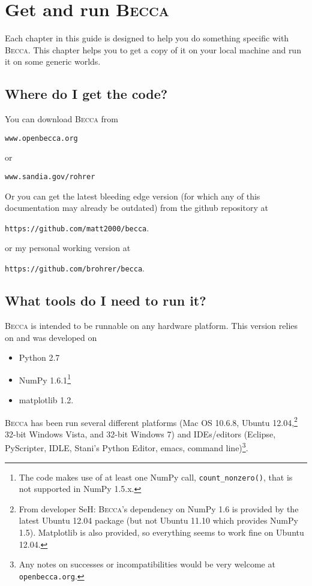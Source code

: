 \chapter{Get and run \textsc{Becca}}

Each chapter in this guide is designed to help you do something specific with \textsc{Becca}. This chapter helps you to get a copy of it on your local machine and run it on some generic worlds.

\section{Where do I get the code?}

You can download \textsc{Becca} from 

\texttt{www.openbecca.org} 

or 

\texttt{www.sandia.gov/rohrer} 

Or you can get the latest bleeding edge version (for which any of this documentation may already be outdated) from the github repository at

\texttt{https://github.com/matt2000/becca}.

or my personal working version at

\texttt{https://github.com/brohrer/becca}.

\section{What tools do I need to run it?}

\textsc{Becca} is intended to be runnable on any hardware platform. This version relies on and was developed on 
\begin{itemize}
\item{Python 2.7}
\item{NumPy 1.6.1\footnote{The code makes use of at least one NumPy call, \texttt{count\_nonzero()}, that is not supported in NumPy 1.5.x.} }
\item{matplotlib 1.2}.
\end{itemize}
\textsc{Becca} has been run several different platforms (Mac OS 10.6.8, Ubuntu 12.04,\footnote{From developer SeH: \textsc{Becca}'s dependency on NumPy 1.6 is provided by the latest Ubuntu 12.04 package (but not Ubuntu 11.10 which provides NumPy 1.5).  Matplotlib is also provided, so everything seems to work fine on Ubuntu 12.04.} 32-bit Windows Vista, and 32-bit Windows 7) and IDEs/editors (Eclipse, PyScripter, IDLE, Stani's Python Editor, emacs, command line)\footnote{Any notes on successes or incompatibilities would be very welcome at \texttt{openbecca.org}.}. 

